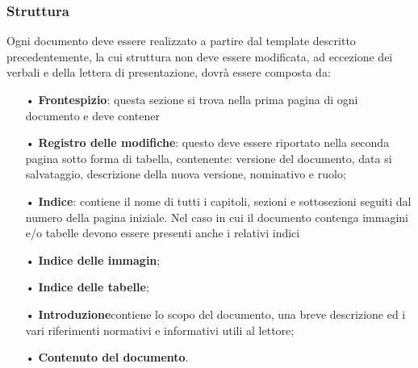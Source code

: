 \subsubsection{Struttura}
Ogni documento deve essere realizzato a partire dal template descritto precedentemente, la cui struttura non deve essere modificata, ad eccezione dei verbali e della lettera di presentazione, dovrà essere composta da:
\begin{itemize}
\item[•] \textbf{Frontespizio}: questa sezione si trova nella prima pagina di ogni documento e deve contener
\item[•] \textbf{Registro delle modifiche}: questo deve essere riportato nella seconda pagina sotto forma di tabella, contenente: versione del documento, data si salvataggio, descrizione della nuova versione, nominativo e ruolo;
\item[•] \textbf{Indice}: contiene il nome di tutti i capitoli, sezioni e sottosezioni seguiti dal numero della pagina iniziale. Nel caso in cui il documento contenga immagini e/o tabelle devono essere presenti anche i relativi indici
\item[•] \textbf{Indice delle immagin};
\item[•] \textbf{Indice delle tabelle};
\item[•] \textbf{Introduzione}contiene lo scopo del documento, una breve descrizione ed i vari riferimenti normativi e informativi utili al lettore;
\item[•] \textbf{Contenuto del documento}.
\end{itemize}

